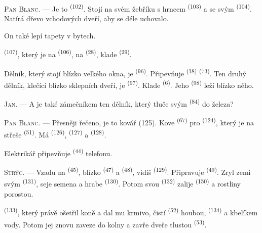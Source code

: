 \VUsaut{3.0mm}
\VUsaut{3.0mm}

\textsc{Pan Blanc}. --- Je to  \textsuperscript{(102)}. Stojí na svém
žebříku s hrncem  \textsuperscript{(103)} a se svým 
\textsuperscript{(104)}. Natírá dřevo vchodových dveří, aby se déle uchovalo.

On také lepí tapety v bytech.

 \textsuperscript{(107)}, který je na 
\textsuperscript{(106)}, na  \textsuperscript{(28)}, klade
 \textsuperscript{(29)}.

Dělník, který stojí blízko velkého okna, je  \textsuperscript{(96)}.
Připevňuje  \textsuperscript{(18)} 
\textsuperscript{(73)}. Ten druhý dělník, klečící blízko sklepních dveří, je
 \textsuperscript{(97)}. Klade  \textsuperscript{(6)}.
Jeho  \textsuperscript{(98)} leží blízko něho.

\textsc{Jan}. --- A je také zámečníkem ten dělník, který tluče svým 
\textsuperscript{(84)} do železa?

\textsc{Pan Blanc}. --- Přesněji řečeno, je to kovář (125). Kove  \textsuperscript{(67)} pro  \textsuperscript{(124)},
který je na střeše  \textsuperscript{(51)}. Má 
\textsuperscript{(126)},  \textsuperscript{(127)} a
 \textsuperscript{(128)}.

Elektrikář připevňuje  \textsuperscript{(44)}  telefonu.

\VUsaut{3.0mm}

\textsc{Strýc}. --- Vzadu na  \textsuperscript{(45)}, blízko
 \textsuperscript{(47)} a  \textsuperscript{(48)}, vidíš
 \textsuperscript{(129)}. Připravuje 
\textsuperscript{(49)}. Zryl zemi svým  \textsuperscript{(131)}, seje
semena a hrabe  \textsuperscript{(130)}. Potom svou 
\textsuperscript{(132)} zalije  \textsuperscript{(150)} a rostliny
porostou.

 \textsuperscript{(133)}, který právě ošetřil koně a dal mu krmivo,
čistí  \textsuperscript{(52)} houbou, 
\textsuperscript{(134)} a kbelíkem vody. Potom jej znovu zaveze do kolny a zavře dveře
tlustou  \textsuperscript{(53)}.

